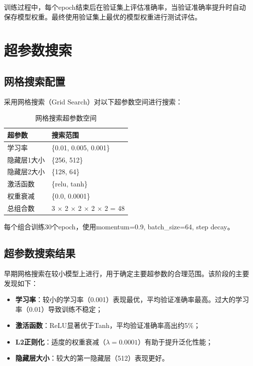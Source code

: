 \documentclass[12pt,a4paper]{article}
\begin{document}
训练过程中，每个epoch结束后在验证集上评估准确率，当验证准确率提升时自动保存模型权重。最终使用验证集上最优的模型权重进行测试评估。

\section{超参数搜索}

\subsection{网格搜索配置}

采用网格搜索（Grid Search）对以下超参数空间进行搜索：

\begin{table}[H]
\centering
\caption{网格搜索超参数空间}
\label{tab:grid_search}
\begin{tabular}{ll}
\toprule
\textbf{超参数} & \textbf{搜索范围} \\
\midrule
学习率 & \{0.01, 0.005, 0.001\} \\
隐藏层1大小 & \{256, 512\} \\
隐藏层2大小 & \{128, 64\} \\
激活函数 & \{relu, tanh\} \\
权重衰减 & \{0.0, 0.0001\} \\
\midrule
总组合数 & 3 $\times$ 2 $\times$ 2 $\times$ 2 $\times$ 2 = 48 \\
\bottomrule
\end{tabular}
\end{table}

每个组合训练30个epoch，使用momentum=0.9, batch\_size=64, step decay。

\subsection{超参数搜索结果}

早期网格搜索在较小模型上进行，用于确定主要超参数的合理范围。该阶段的主要发现如下：

\begin{itemize}[leftmargin=2em]
    \item \textbf{学习率}：较小的学习率（0.001）表现最优，平均验证准确率最高。过大的学习率（0.01）导致训练不稳定；
    \item \textbf{激活函数}：ReLU显著优于Tanh，平均验证准确率高出约5\%；
    \item \textbf{L2正则化}：适度的权重衰减（$\lambda=0.0001$）有助于提升泛化性能；
    \item \textbf{隐藏层大小}：较大的第一隐藏层（512）表现更好。
\end{itemize}
\end{document}
